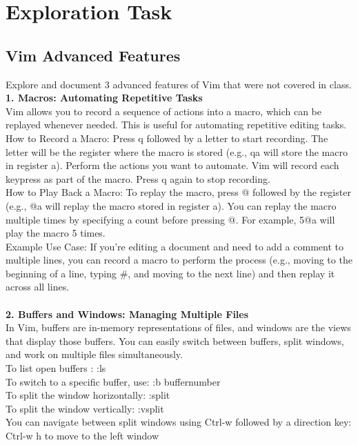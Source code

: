 \documentclass[a4paper,12pt]{article}
\begin{document}
\clearpage
\section{Exploration Task}
\subsection{Vim Advanced Features}
Explore and document 3 advanced features of Vim that were not covered in class.
\\\textbf{1. Macros: Automating Repetitive Tasks}
\\Vim allows you to record a sequence of actions into a macro, which can be replayed whenever needed. This is useful for automating repetitive editing tasks.
\\How to Record a Macro:
Press q followed by a letter to start recording. The letter will be the register where the macro is stored (e.g., qa will store the macro in register a).
Perform the actions you want to automate. Vim will record each keypress as part of the macro.
Press q again to stop recording.
\\How to Play Back a Macro:
To replay the macro, press @ followed by the register (e.g., @a will replay the macro stored in register a).
You can replay the macro multiple times by specifying a count before pressing @. For example, 5@a will play the macro 5 times.
\\Example Use Case:
If you're editing a document and need to add a comment to multiple lines, you can record a macro to perform the process (e.g., moving to the beginning of a line, typing #, and moving to the next line) and then replay it across all lines.
\\
\\\textbf{2. Buffers and Windows: Managing Multiple Files}
\\In Vim, buffers are in-memory representations of files, and windows are the views that display those buffers. You can easily switch between buffers, split windows, and work on multiple files simultaneously.
\\To list open buffers : :ls
\\To switch to a specific buffer, use:  :b buffernumber
\\To split the window horizontally:  :split
\\To split the window vertically:  :vsplit
\\You can navigate between split windows using Ctrl-w followed by a direction key:
\\Ctrl-w h to move to the left window
\end{document}
